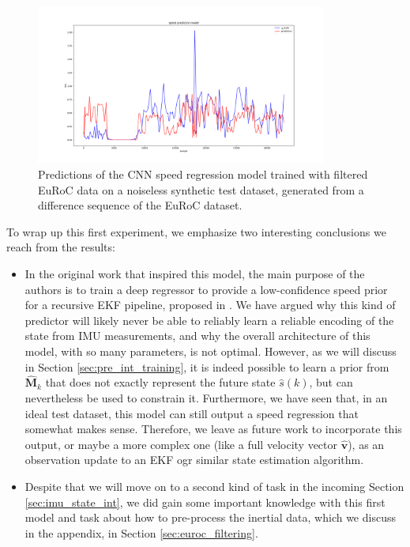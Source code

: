 \begin{figure}[h]
   \centering
   \includegraphics[width=0.85\textwidth]{thesis_template/img/ideal_filtered_speed_prediction_expandedplot.png}
   \caption{Predictions of the CNN speed regression model trained with filtered EuRoC data on a noiseless synthetic test dataset, generated from a difference sequence of the EuRoC dataset.}
   \label{fig:speed_prediction_ideal_filtered}
\end{figure}

To wrap up this first experiment, we emphasize two interesting conclusions we reach from the results:
\begin{itemize}
    \item In the original work \cite{DBLP:journals/corr/abs-1808-03485} that inspired this model, the main purpose of the authors is to train a deep regressor to provide a low-confidence speed prior for a recursive EKF pipeline, proposed in \cite{DBLP:journals/corr/SolinCRK17}. 
    We have argued why this kind of predictor will likely never be able to reliably learn a reliable encoding of the state from IMU measurements, and why the overall architecture of this model, with so many parameters, is not optimal. 
    However, as we will discuss in Section \ref{sec:pre_int_training}, it is indeed possible to learn a prior from $\mathbf{\hat{M}}_k$ that does not exactly represent the future state $\hat{s}(k)$, but can nevertheless be used to constrain it. 
    Furthermore, we have seen that, in an ideal test dataset, this model can still output a speed regression that somewhat makes sense. 
    Therefore, we leave as future work to incorporate this output, or maybe a more complex one (like a full velocity vector $\mathbf{\hat{v}}$), as an observation update to an EKF ogr similar state estimation algorithm.
    \item Despite that we will move on to a second kind of task in the incoming Section \ref{sec:imu_state_int}, we did gain some important knowledge with this first model and task about how to pre-process the inertial data, which we discuss in the appendix, in Section \ref{sec:euroc_filtering}.
\end{itemize}


